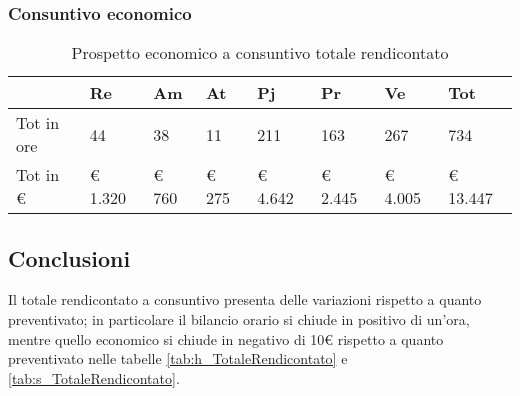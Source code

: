 			\subsubsection{Consuntivo economico}
			\begin{table}[H] \begin{center} \begin{tabular}{llllllll}
						\toprule
						&	\textbf{Re}	&	\textbf{Am}	&	\textbf{At}	&	\textbf{Pj}	&	\textbf{Pr}	&	\textbf{Ve}	&	\textbf{Tot}\\
							\midrule																					
						Tot in ore	&	44		&	38		&	11		&	211		&	163		&	267		&	734	\\
						Tot in €	&	 € 1.320 		 & 	 € 760 		 & 	 € 275 		 & 	 € 4.642 		 & 	 € 2.445 		 & 	 € 4.005 		 & 	 € 13.447 	\\

						\bottomrule			
					\end{tabular} \end{center} \caption{Prospetto economico a consuntivo totale rendicontato
				}\label{tab:s_TotaleNonRendicontato} \end{table}

	\subsection{Conclusioni}
	\label{consid_cons_pl}
	Il totale rendicontato a consuntivo presenta delle variazioni rispetto a quanto preventivato; in particolare il bilancio orario si chiude in positivo di un'ora, mentre quello economico si chiude in negativo di 10€ rispetto a quanto preventivato nelle tabelle \ref{tab:h_TotaleRendicontato} e  \ref{tab:s_TotaleRendicontato}.